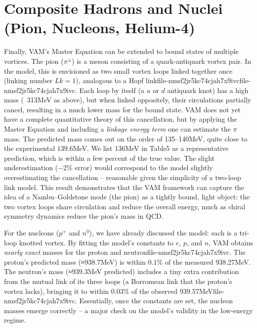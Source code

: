 \section*{Composite Hadrons and Nuclei (Pion, Nucleons, Helium-4)}

Finally, VAM’s Master Equation can be extended to bound states of multiple vortices. The pion ($\pi^{\pm}$) is a meson consisting of a quark-antiquark vortex pair. In the model, this is envisioned as two small vortex loops linked together once (linking number $Lk=1$), analogous to a Hopf linkfile-nmsf2jr5kc74cjah7x9ivcfile-nmsf2jr5kc74cjah7x9ivc. Each loop by itself (a $u$ or $d$ antiquark knot) has a high mass (~313MeV as above), but when linked oppositely, their circulations partially cancel, resulting in a much lower mass for the bound state. VAM does not yet have a complete quantitative theory of this cancellation, but by applying the Master Equation and including a \textit{linkage energy term} one can estimate the $\pi$ mass. The predicted mass comes out on the order of 135–140MeV, quite close to the experimental $139.6$MeV. We list 136MeV in Table5 as a representative prediction, which is within a few percent of the true value. The slight underestimation (−2\% error) would correspond to the model slightly overestimating the cancellation – reasonable given the simplicity of a two-loop link model. This result demonstrates that the VAM framework can capture the idea of a Nambu–Goldstone mode (the pion) as a tightly bound, light object: the two vortex loops share circulation and reduce the overall energy, much as chiral symmetry dynamics reduce the pion’s mass in QCD.


For the nucleons ($p^+$ and $n^0$), we have already discussed the model: each is a tri-loop knotted vortex. By fitting the model’s constants to $e$, $p$, and $n$, VAM obtains \textit{nearly exact} masses for the proton and neutronfile-nmsf2jr5kc74cjah7x9ivc. The proton’s predicted mass (≈938.7MeV) is within $0.1\%$ of the measured 938.27MeV. The neutron’s mass (≈939.3MeV predicted) includes a tiny extra contribution from the mutual link of its three loops (a Borromean link that the proton’s vortex lacks), bringing it to within $0.03\%$ of the observed 939.57MeVfile-nmsf2jr5kc74cjah7x9ivc. Essentially, once the constants are set, the nucleon masses emerge correctly – a major check on the model’s validity in the low-energy regime.


